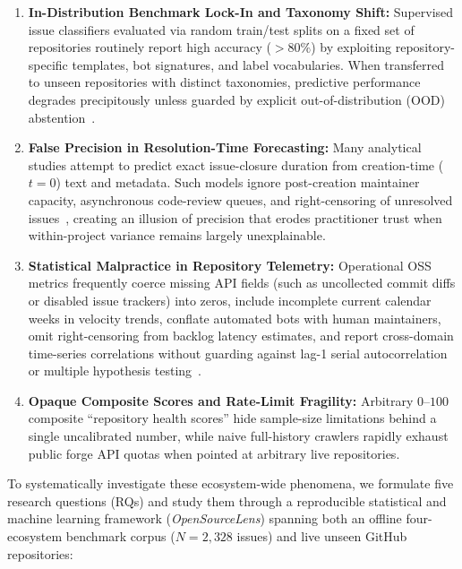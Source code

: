 \documentclass[conference]{IEEEtran}
\begin{document}
\begin{enumerate}
    \item \textbf{In-Distribution Benchmark Lock-In and Taxonomy Shift:} Supervised issue classifiers evaluated via random train/test splits on a fixed set of repositories routinely report high accuracy ($>80\%$) by exploiting repository-specific templates, bot signatures, and label vocabularies. When transferred to unseen repositories with distinct taxonomies, predictive performance degrades precipitously unless guarded by explicit out-of-distribution (OOD) abstention~\cite{geifman2017selective}.
    \item \textbf{False Precision in Resolution-Time Forecasting:} Many analytical studies attempt to predict exact issue-closure duration from creation-time ($t=0$) text and metadata. Such models ignore post-creation maintainer capacity, asynchronous code-review queues, and right-censoring of unresolved issues~\cite{kaplan1958nonparametric}, creating an illusion of precision that erodes practitioner trust when within-project variance remains largely unexplainable.
    \item \textbf{Statistical Malpractice in Repository Telemetry:} Operational OSS metrics frequently coerce missing API fields (such as uncollected commit diffs or disabled issue trackers) into zeros, include incomplete current calendar weeks in velocity trends, conflate automated bots with human maintainers, omit right-censoring from backlog latency estimates, and report cross-domain time-series correlations without guarding against lag-1 serial autocorrelation or multiple hypothesis testing~\cite{benjamini1995controlling}.
    \item \textbf{Opaque Composite Scores and Rate-Limit Fragility:} Arbitrary $0$--$100$ composite ``repository health scores'' hide sample-size limitations behind a single uncalibrated number, while naive full-history crawlers rapidly exhaust public forge API quotas when pointed at arbitrary live repositories.
\end{enumerate}

To systematically investigate these ecosystem-wide phenomena, we formulate five research questions (RQs) and study them through a reproducible statistical and machine learning framework (\emph{OpenSourceLens}) spanning both an offline four-ecosystem benchmark corpus ($N=2{,}328$ issues) and live unseen GitHub repositories:
\end{document}
